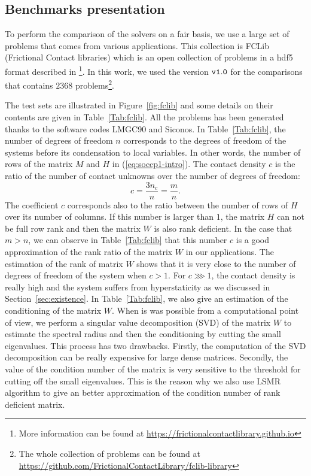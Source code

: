 \subsection{Benchmarks presentation}


To perform the comparison of the solvers on a fair basis, we use a large set of problems that comes from various applications. This collection is FCLib (Frictional Contact libraries)  which is an open collection of problems in a hdf5 format described in \citep{acary:hal-00945820}\footnote{More information can be found at \href{https://frictionalcontactlibrary.github.io}{https://frictionalcontactlibrary.github.io}}. In this work, we used the version $\tt v1.0$ for the comparisons that contains $2368$ problems\footnote{
The whole collection of problems can be found at \href{https://github.com/FrictionalContactLibrary/fclib-library}{https://github.com/FrictionalContactLibrary/fclib-library}}.

The test sets are illustrated in Figure~\ref{fig:fclib} and some details on their contents are given in Table~\ref{Tab:fclib}. All the problems has been generated thanks to the software codes LMGC90 and Siconos. In Table~\ref{Tab:fclib}, the number of degrees of freedom $n$ corresponds to the degrees of freedom of the systems before its condensation to local variables. In other words, the number of rows of the matrix $M$ and $H$ in  (\ref{eq:soccp1-intro}). The contact density $c$ is the ratio of the number of contact unknowns over the number of degrees of freedom:
\begin{equation}
  \label{eq:fclib-1}
  c= \frac {3 n_c }{ n} = \frac {m} {n}.
\end{equation}
 The coefficient $c$ corresponds also to the ratio between the number of rows of $H$ over its number of columns. If this number is larger than $1$, the matrix $H$ can not be full row rank and then the matrix $W$ is also rank deficient. In the case that $m >n$, we can observe in Table~\ref{Tab:fclib} that  this number $c$ is a good approximation of the rank ratio of the matrix $W$ in our applications. The estimation of the rank of matrix $W$ shows that it is very close to the number of degrees of freedom of the system when $c>1$. For $c \ggg 1$, the contact density is really high and the system suffers from hyperstaticity as we discussed in Section~\ref{sec:existence}. In Table~\ref{Tab:fclib}, we also give an estimation of the conditioning of the matrix $W$. When is was possible from a computational point of view, we perform a singular value decomposition (SVD) of the matrix $W$ to estimate the spectral radius and then the conditioning by cutting the small eigenvalues. This process has two drawbacks. Firstly, the computation of the SVD decomposition can be really expensive for large dense matrices. Secondly, the value of the condition number of the matrix is very sensitive to the threshold for cutting off the small eigenvalues. This is the reason why we also use LSMR~\citep{Fong.Saunders_SISC2011} algorithm to give an better approximation of the condition number of rank deficient matrix. 

